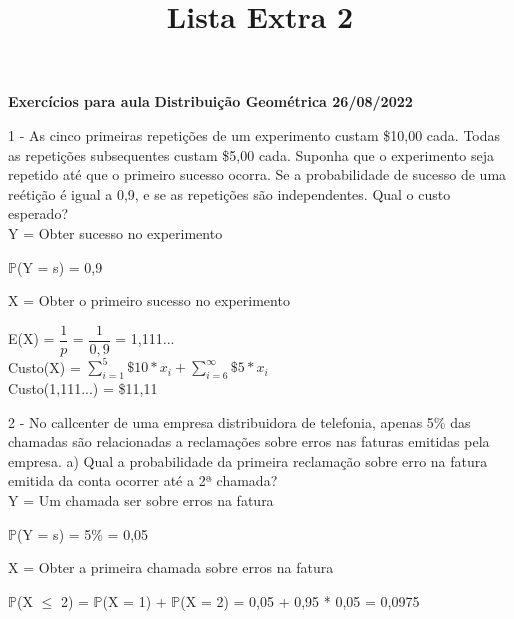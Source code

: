 \documentclass[12pt,a4paper]{article}
\title{Lista Extra 2}
\date{}
\begin{document}
	\maketitle
	\begin{center}
		\textbf{Exercícios para aula}
		\textbf{Distribuição Geométrica 26/08/2022}
	\end{center}
	1 - As cinco primeiras repetições de um experimento custam \$10,00 cada. Todas as repetições subsequentes custam \$5,00 cada. Suponha que o experimento seja repetido até que o primeiro sucesso ocorra. Se a probabilidade de sucesso de uma reétição é igual a 0,9, e se as repetições são independentes. Qual o custo esperado?
	\vspace{0.5cm}\\
	Y =  Obter sucesso no experimento
	\begin{center}
		\vspace{0.5cm}
		$\mathbb{P}$(Y = s) = 0,9
		\vspace{1cm}\\
	\end{center}
	X = Obter o primeiro sucesso no experimento
	\begin{center}
		\vspace{0.5cm}
		E(X) = $\dfrac{1}{p}$ = $\dfrac{1}{0,9}$ = 1,111...
		\vspace{1cm}\\
		Custo(X) = $\sum_{i=1}^{5}\$10*x_{i} + \sum_{i=6}^{\infty}\$5*x_{i}$
		\vspace{0.5cm}\\
		Custo(1,111...) = \$11,11
	\end{center}
	\vspace{1cm}
	2 - No callcenter de uma empresa distribuidora de telefonia, apenas 5\% das chamadas são relacionadas a reclamações sobre erros nas faturas emitidas pela empresa.
	a) Qual a probabilidade da primeira reclamação sobre erro na fatura emitida da conta ocorrer até a 2ª chamada?
	\vspace{0.5cm}\\
	Y =  Um chamada ser sobre erros na fatura
	\begin{center}
		\vspace{0.5cm}
		$\mathbb{P}$(Y = s) = 5\% = 0,05
		\vspace{1cm}\\
	\end{center}
	X = Obter a primeira chamada sobre erros na fatura
	\begin{center}
		\vspace{0.5cm}
		$\mathbb{P}$(X $\leq$ 2) = $\mathbb{P}$(X = 1) + $\mathbb{P}$(X = 2) = 0,05 + 0,95 * 0,05 = 0,0975 		
	\end{center}
\end{document}

